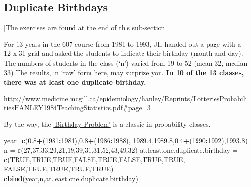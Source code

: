 \documentclass[]{book}
\newenvironment{Shaded}{\begin{snugshade}}{\end{snugshade}}
\newcommand{\DecValTok}[1]{\textcolor[rgb]{0.00,0.00,0.81}{#1}}
\newcommand{\FloatTok}[1]{\textcolor[rgb]{0.00,0.00,0.81}{#1}}
\newcommand{\KeywordTok}[1]{\textcolor[rgb]{0.13,0.29,0.53}{\textbf{#1}}}
\newcommand{\NormalTok}[1]{#1}
\newcommand{\OperatorTok}[1]{\textcolor[rgb]{0.81,0.36,0.00}{\textbf{#1}}}
\newcommand{\OtherTok}[1]{\textcolor[rgb]{0.56,0.35,0.01}{#1}}
\newcommand{\StringTok}[1]{\textcolor[rgb]{0.31,0.60,0.02}{#1}}
\begin{document}
\hypertarget{duplicate-birthdays}{%
\subsection{Duplicate Birthdays}\label{duplicate-birthdays}}

{[}The exercises are found at the end of this sub-section{]}

For 13 years in the 607 course from 1981 to 1993, JH handed out a page with a 12 x 31 grid and asked the students to indicate their birthday (month and day). The numbers of students in the class (`n') varied from 19 to 52 (mean 32, median 33)
The results, \href{http://www.medicine.mcgill.ca/epidemiology/hanley/c323/excel/birthdays_607.pdf}{in `raw' form here}, may surprize you. \textbf{In 10 of the 13 classes, there was at least one duplicate birthday.}

\url{http://www.medicine.mcgill.ca/epidemiology/hanley/Reprints/LotteriesProbabilitiesHANLEY1984TeachingStatistics.pdf\#page=3}

By the way, the \href{https://en.wikipedia.org/wiki/Birthday_problem}{`Birthday Problem'} is a classic in probability classes.

\begin{Shaded}
\begin{Highlighting}[]
\NormalTok{year=}\KeywordTok{c}\NormalTok{(}\FloatTok{0.8}\OperatorTok{+}\NormalTok{(}\DecValTok{1981}\OperatorTok{:}\DecValTok{1984}\NormalTok{),}\FloatTok{0.8}\OperatorTok{+}\NormalTok{(}\DecValTok{1986}\OperatorTok{:}\DecValTok{1988}\NormalTok{),}
       \FloatTok{1989.4}\NormalTok{,}\FloatTok{1989.8}\NormalTok{,}\FloatTok{0.4}\OperatorTok{+}\NormalTok{(}\DecValTok{1990}\OperatorTok{:}\DecValTok{1992}\NormalTok{),}\FloatTok{1993.8}\NormalTok{)}
\NormalTok{n =}\StringTok{ }\KeywordTok{c}\NormalTok{(}\DecValTok{27}\NormalTok{,}\DecValTok{37}\NormalTok{,}\DecValTok{33}\NormalTok{,}\DecValTok{20}\NormalTok{,}\DecValTok{21}\NormalTok{,}\DecValTok{19}\NormalTok{,}\DecValTok{39}\NormalTok{,}\DecValTok{31}\NormalTok{,}\DecValTok{31}\NormalTok{,}\DecValTok{52}\NormalTok{,}\DecValTok{43}\NormalTok{,}\DecValTok{49}\NormalTok{,}\DecValTok{32}\NormalTok{)}
\NormalTok{at.least.one.duplicate.birthday =}
\StringTok{   }\KeywordTok{c}\NormalTok{(}\OtherTok{TRUE}\NormalTok{,}\OtherTok{TRUE}\NormalTok{,}\OtherTok{TRUE}\NormalTok{,}\OtherTok{FALSE}\NormalTok{,}\OtherTok{TRUE}\NormalTok{,}\OtherTok{FALSE}\NormalTok{,}\OtherTok{TRUE}\NormalTok{,}\OtherTok{TRUE}\NormalTok{,}
     \OtherTok{FALSE}\NormalTok{,}\OtherTok{TRUE}\NormalTok{,}\OtherTok{TRUE}\NormalTok{,}\OtherTok{TRUE}\NormalTok{,}\OtherTok{TRUE}\NormalTok{) }
\KeywordTok{cbind}\NormalTok{(year,n,at.least.one.duplicate.birthday)}
\end{Highlighting}
\end{Shaded}
\end{document}
